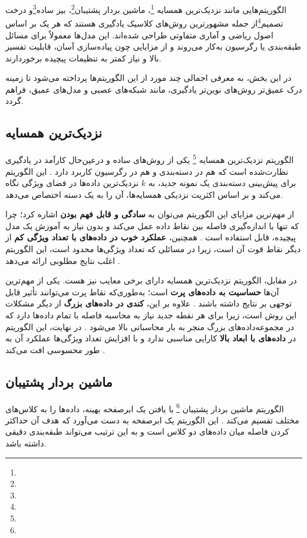 الگوریتم‌هایی مانند نزدیک‌ترین همسایه \footnote{}، ماشین بردار پشتیبان\footnote{}، بیز ساده\footnote{}و درخت تصمیم\footnote{}از جمله مشهورترین روش‌های کلاسیک یادگیری هستند که هر یک بر اساس اصول ریاضی و آماری متفاوتی طراحی شده‌اند. این مدل‌ها معمولاً برای مسائل طبقه‌بندی یا رگرسیون به‌کار می‌روند و از مزایایی چون پیاده‌سازی آسان، قابلیت تفسیر بالا و نیاز کمتر به تنظیمات پیچیده برخوردارند.

در این بخش، به معرفی اجمالی چند مورد از این الگوریتم‌ها پرداخته می‌شود تا زمینه درک عمیق‌تر روش‌های نوین‌تر یادگیری، مانند شبکه‌های عصبی و مدل‌های عمیق، فراهم گردد.

\subsection{نزدیک‌ترین همسایه }

الگوریتم نزدیک‌ترین همسایه \footnote{} یکی از روش‌های ساده و درعین‌حال کارآمد در یادگیری نظارت‌شده است که هم در دسته‌بندی و هم در رگرسیون کاربرد دارد
\cite{cover1967nearest,duda1973pattern,mitchell1997machine}.
این الگوریتم برای پیش‌بینی دسته‌بندی یک نمونه جدید، به $k$ نزدیک‌ترین داده‌ها در فضای ویژگی نگاه می‌کند و بر اساس اکثریت نزدیکی همسایه‌ها، آن را به یک دسته اختصاص می‌دهد. 


از مهم‌ترین مزایای این الگوریتم می‌توان به \textbf{سادگی و قابل فهم بودن} اشاره کرد؛ چرا که تنها با اندازه‌گیری فاصله بین نقاط داده عمل می‌کند و بدون نیاز به آموزش یک مدل پیچیده، قابل استفاده است \cite{cover1967nearest}. همچنین، \textbf{عملکرد خوب در داده‌های با تعداد ویژگی کم} از دیگر نقاط قوت آن است، زیرا در مسائلی که تعداد ویژگی‌ها محدود است، این الگوریتم اغلب نتایج مطلوبی ارائه می‌دهد \cite{james2013introduction}.


در مقابل، الگوریتم نزدیک‌ترین همسایه دارای برخی معایب نیز هست. یکی از مهم‌ترین آن‌ها \textbf{حساسیت به داده‌های پرت} است؛ به‌طوری‌که نقاط پرت می‌توانند تأثیر قابل توجهی بر نتایج داشته باشند \cite{duda1973pattern}. علاوه بر این، \textbf{کندی در داده‌های بزرگ} از دیگر مشکلات این روش است، زیرا برای هر نقطه جدید نیاز به محاسبه فاصله با تمام داده‌ها دارد که در مجموعه‌داده‌های بزرگ منجر به بار محاسباتی بالا می‌شود \cite{mitchell1997machine}. در نهایت، این الگوریتم در \textbf{داده‌های با ابعاد بالا} کارایی مناسبی ندارد و با افزایش تعداد ویژگی‌ها عملکرد آن به طور محسوسی افت می‌کند \cite{murphy2012machine}.



\subsection{ماشین بردار پشتیبان}
الگوریتم ماشین بردار پشتیبان \footnote{} با یافتن یک ابرصفحه بهینه، داده‌ها را به کلاس‌های مختلف تقسیم می‌کند
\cite{cortes1995support,vapnik1998statistical}.
این الگوریتم یک ابرصفحه به دست می‌آورد که هدف آن حداکثر کردن فاصله میان داده‌های دو کلاس است و به این ترتیب می‌تواند طبقه‌بندی دقیقی داشته باشد.


